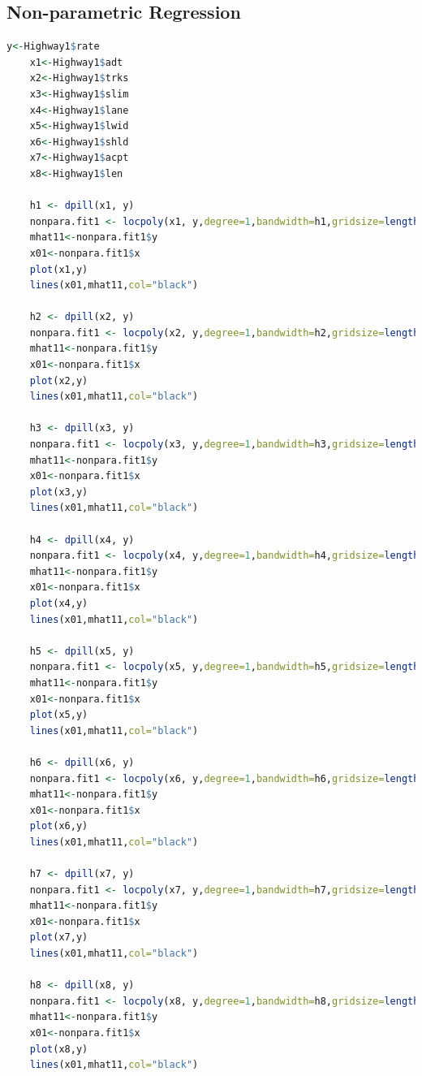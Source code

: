 \documentclass[12pt]{report}
\begin{document}
\subsection{Non-parametric Regression}
\begin{lstlisting}[language=R]
    y<-Highway1$rate
    x1<-Highway1$adt
    x2<-Highway1$trks
    x3<-Highway1$slim
    x4<-Highway1$lane
    x5<-Highway1$lwid
    x6<-Highway1$shld
    x7<-Highway1$acpt
    x8<-Highway1$len

    h1 <- dpill(x1, y)
    nonpara.fit1 <- locpoly(x1, y,degree=1,bandwidth=h1,gridsize=length(x1))
    mhat11<-nonpara.fit1$y
    x01<-nonpara.fit1$x
    plot(x1,y)
    lines(x01,mhat11,col="black")
    
    h2 <- dpill(x2, y)
    nonpara.fit1 <- locpoly(x2, y,degree=1,bandwidth=h2,gridsize=length(x2))
    mhat11<-nonpara.fit1$y
    x01<-nonpara.fit1$x
    plot(x2,y)
    lines(x01,mhat11,col="black")
    
    h3 <- dpill(x3, y)
    nonpara.fit1 <- locpoly(x3, y,degree=1,bandwidth=h3,gridsize=length(x3))
    mhat11<-nonpara.fit1$y
    x01<-nonpara.fit1$x
    plot(x3,y)
    lines(x01,mhat11,col="black")
    
    h4 <- dpill(x4, y)
    nonpara.fit1 <- locpoly(x4, y,degree=1,bandwidth=h4,gridsize=length(x4))
    mhat11<-nonpara.fit1$y
    x01<-nonpara.fit1$x
    plot(x4,y)
    lines(x01,mhat11,col="black")
    
    h5 <- dpill(x5, y)
    nonpara.fit1 <- locpoly(x5, y,degree=1,bandwidth=h5,gridsize=length(x5))
    mhat11<-nonpara.fit1$y
    x01<-nonpara.fit1$x
    plot(x5,y)
    lines(x01,mhat11,col="black")
    
    h6 <- dpill(x6, y)
    nonpara.fit1 <- locpoly(x6, y,degree=1,bandwidth=h6,gridsize=length(x6))
    mhat11<-nonpara.fit1$y
    x01<-nonpara.fit1$x
    plot(x6,y)
    lines(x01,mhat11,col="black")
    
    h7 <- dpill(x7, y)
    nonpara.fit1 <- locpoly(x7, y,degree=1,bandwidth=h7,gridsize=length(x7))
    mhat11<-nonpara.fit1$y
    x01<-nonpara.fit1$x
    plot(x7,y)
    lines(x01,mhat11,col="black")
    
    h8 <- dpill(x8, y)
    nonpara.fit1 <- locpoly(x8, y,degree=1,bandwidth=h8,gridsize=length(x8))
    mhat11<-nonpara.fit1$y
    x01<-nonpara.fit1$x
    plot(x8,y)
    lines(x01,mhat11,col="black")
\end{lstlisting}
\end{document}
